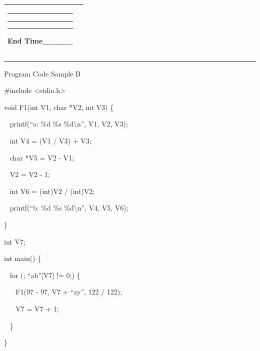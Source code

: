 \documentclass[12pt, a4paper, oneside]{article}
\begin{document}
\begin{longtable}[]{@{}ll@{}}
\begin{minipage}[t]{0.47\columnwidth}
{}

\begin{center}\rule{0.5\linewidth}{\linethickness}\end{center}

{}

\begin{center}\rule{0.5\linewidth}{\linethickness}\end{center}

{}

\begin{center}\rule{0.5\linewidth}{\linethickness}\end{center}

{}

{}

{End Time\_\_\_\_\_}
\strut\end{minipage}\tabularnewline
\bottomrule
\end{longtable}

\begin{center}\rule{0.5\linewidth}{\linethickness}\end{center}

{Program Code Sample B}

{}

{\#include \textless{}stdio.h\textgreater{}}

{void F1(int V1, char *V2, int V3) \{}

{~ printf(``a: \%d \%s \%d\textbackslash{}n'', V1, V2, V3);}

{~ int V4 = (V1 / V3) + V3;}

{~ char *V5 = V2 - V1;}

{~ V2 = V2 - 1;}

{~ int V6 = (int)V2 / (int)V2;}

{~ printf(``b: \%d \%s \%d\textbackslash{}n'', V4, V5, V6);}

{\}}

{int V7;}

{int main() \{}

{~ for (; ``ab''{[}V7{]} != 0;) \{}

{~ ~ F1(97 - 97, V7 + ``zy'', 122 / 122);}

{~ ~ V7 = V7 + 1;}

{~ \}}

{\}}

{}

{}

{}

{}
\end{document}
